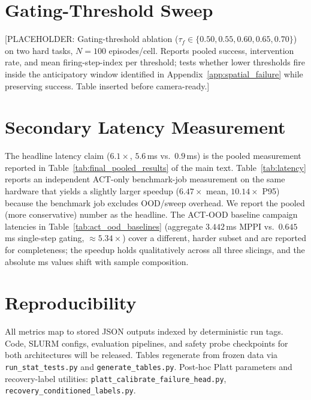 \section{Gating-Threshold Sweep}
\label{app:threshold_sweep}

{\color{blue}[PLACEHOLDER: Gating-threshold ablation ($\tau_f \in \{0.50, 0.55, 0.60, 0.65, 0.70\}$) on two hard tasks, $N{=}100$ episodes/cell. Reports pooled success, intervention rate, and mean firing-step-index per threshold; tests whether lower thresholds fire inside the anticipatory window identified in Appendix~\ref{app:spatial_failure} while preserving success. Table inserted before camera-ready.]}

\section{Secondary Latency Measurement}
\label{app:latency_secondary}



The headline latency claim ($6.1\times$, $5.6$\,ms vs.\ $0.9$\,ms) is the pooled measurement reported in Table~\ref{tab:final_pooled_results} of the main text. Table~\ref{tab:latency} reports an independent ACT-only benchmark-job measurement on the same hardware that yields a slightly larger speedup ($6.47\times$ mean, $10.14\times$ P95) because the benchmark job excludes OOD/sweep overhead. We report the pooled (more conservative) number as the headline. The ACT-OOD baseline campaign latencies in Table~\ref{tab:act_ood_baselines} (aggregate $3.442$\,ms MPPI vs.\ $0.645$\,ms single-step gating, $\approx 5.34\times$) cover a different, harder subset and are reported for completeness; the speedup holds qualitatively across all three slicings, and the absolute ms values shift with sample composition.

\section{Reproducibility}

All metrics map to stored JSON outputs indexed by deterministic run tags. Code, SLURM configs, evaluation pipelines, and safety probe checkpoints for both architectures will be released. Tables regenerate from frozen data via \texttt{run\_stat\_tests.py} and \texttt{generate\_tables.py}. Post-hoc Platt parameters and recovery-label utilities: \texttt{platt\_calibrate\_failure\_head.py}, \texttt{recovery\_conditioned\_labels.py}.
